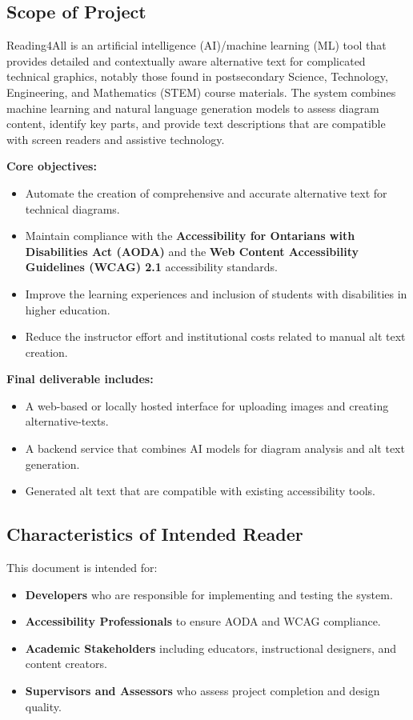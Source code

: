 \documentclass[12pt]{article}
\begin{document}
\subsection{Scope of Project}
Reading4All is an artificial intelligence (AI)/machine learning (ML) tool that
provides detailed and contextually aware alternative text for
complicated technical graphics, notably those found in postsecondary
Science, Technology, Engineering, and Mathematics (STEM) course materials. The system combines machine learning and natural
language generation models to assess diagram content, identify key
parts, and provide text descriptions that are compatible with screen
readers and assistive technology.

\noindent \textbf{Core objectives:}
\begin{itemize}
  \item Automate the creation of comprehensive and accurate
    alternative text for technical diagrams.
  \item Maintain compliance with the \textbf{Accessibility for
    Ontarians with Disabilities Act (AODA)} and the \textbf{Web Content Accessibility Guidelines (WCAG) 2.1}
    accessibility standards.
  \item Improve the learning experiences and inclusion of students
    with disabilities in higher education.
  \item Reduce the instructor effort and institutional costs related
    to manual alt text creation.
\end{itemize}

\noindent \textbf{Final deliverable includes:}
\begin{itemize}
  \item A web-based or locally hosted interface for uploading images
    and creating alternative-texts.
  \item A backend service that combines AI models for diagram
    analysis and alt text generation.
  \item Generated alt text that are compatible with existing accessibility tools.
\end{itemize}

\subsection{Characteristics of Intended Reader}
This document is intended for:
\begin{itemize}
  \item \textbf{Developers} who are responsible for implementing and
    testing the system.
  \item \textbf{Accessibility Professionals} to ensure AODA and WCAG compliance.
  \item \textbf{Academic Stakeholders} including educators,
    instructional designers, and content creators.
  \item \textbf{Supervisors and Assessors} who assess project
    completion and design quality.
\end{itemize}
\end{document}
